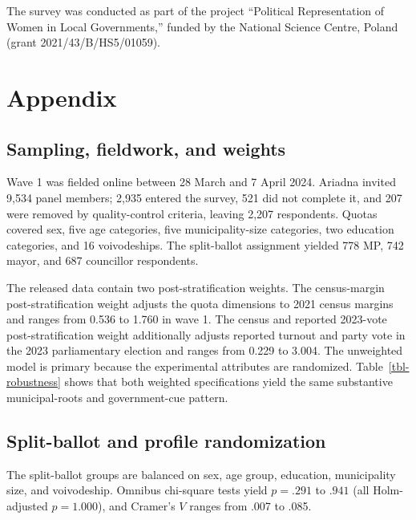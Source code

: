 \documentclass[
  letterpaper,
  DIV=11,
  numbers=noendperiod]{scrartcl}
\begin{document}
The survey was conducted as part of the project ``Political
Representation of Women in Local Governments,'' funded by the National
Science Centre, Poland (grant 2021/43/B/HS5/01059).

\protect{}\label{appendix-count}
\section*{Appendix}\label{appendix}

\subsection*{Sampling, fieldwork, and weights}\label{sec-sampling}

Wave 1 was fielded online between 28 March and 7 April 2024. Ariadna
invited 9,534 panel members; 2,935 entered the survey, 521 did not
complete it, and 207 were removed by quality-control criteria, leaving
2,207 respondents. Quotas covered sex, five age categories, five
municipality-size categories, two education categories, and 16
voivodeships. The split-ballot assignment yielded 778 MP, 742 mayor, and
687 councillor respondents.

The released data contain two post-stratification weights. The
census-margin post-stratification weight adjusts the quota dimensions to
2021 census margins and ranges from 0.536 to 1.760 in wave 1. The census
and reported 2023-vote post-stratification weight additionally adjusts
reported turnout and party vote in the 2023 parliamentary election and
ranges from 0.229 to 3.004. The unweighted model is primary because the
experimental attributes are randomized. Table~\ref{tbl-robustness} shows
that both weighted specifications yield the same substantive
municipal-roots and government-cue pattern.

\subsection*{Split-ballot and profile randomization}\label{sec-balance}

The split-ballot groups are balanced on sex, age group, education,
municipality size, and voivodeship. Omnibus chi-square tests yield
\(p=.291\) to \(.941\) (all Holm-adjusted \(p=1.000\)), and Cramer's
\(V\) ranges from .007 to .085.
\end{document}
